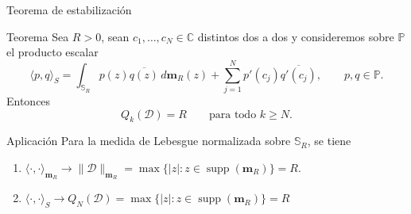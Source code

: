 \documentclass[aspectratio=169,10pt]{beamer}
\newcommand{\C}{\mathbb{C}}
\newcommand{\Poly}{\mathbb{P}}
\newcommand{\D}{\mathcal{D}}
\newcommand{\SR}{\mathbb{S}_R}
\newcommand{\supp}{\operatorname{supp}}
\begin{document}
\begin{frame}{Teorema de estabilización}
  \small
  \begin{block}{Teorema}
    Sea \(R>0\), sean \(c_1,\dots,c_N\in\C\) distintos dos a dos y consideremos sobre \(\Poly\) el producto escalar
    \[
      \langle p,q\rangle_S
      =
      \int_{\mathbb{S}_R}p(z)\overline{q(z)}\,d\mathbf{m}_R(z)
      +
      \sum_{j=1}^N p'(c_j)\overline{q'(c_j)},
      \qquad p,q\in\Poly.
    \]
    Entonces
    \[
      Q_k(\D)=R
      \qquad \text{para todo } k\ge N.
    \]
  \end{block}

  \begin{alertblock}{Aplicación}
    Para la medida de Lebesgue normalizada sobre \(\SR\), se tiene
    \begin{enumerate}
      \item \(\langle \cdot, \cdot\rangle_{\mathbf m_R} \longrightarrow\|\D\|_{\mathbf m_R}=\operatorname{max}\{|z|:z\in\supp(\mathbf m_R)\}=R\).
      \item \(\langle \cdot, \cdot \rangle_{S} \longrightarrow Q_N(\D)=\operatorname{max}\{|z|:z\in\supp(\mathbf m_R)\}=R\)
    \end{enumerate}
  \end{alertblock}

\end{frame}
\end{document}
